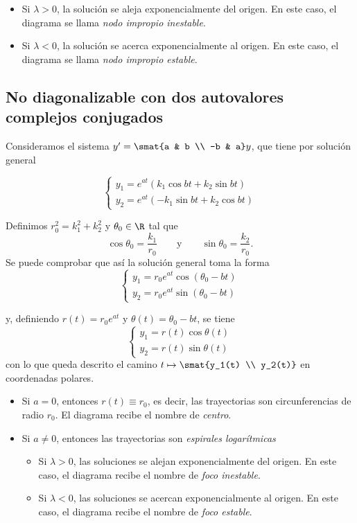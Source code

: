 \documentclass[../ecuaciones_diferenciales.tex]{subfiles}
\begin{document}
\begin{itemize}
	\item Si \(\lambda > 0\), la solución se aleja exponencialmente del origen. En
	      este caso, el diagrama se llama \emph{nodo impropio inestable}.
	\item Si \(\lambda < 0\), la solución se acerca exponencialmente al origen. En
	      este caso, el diagrama se llama \emph{nodo impropio estable}.
\end{itemize}

\subsection{No diagonalizable con dos autovalores complejos conjugados}
Consideramos el sistema \(y' = \smat{a & b \\ -b & a}y\), que tiene por solución
general

\[
	\begin{cases}
		y_1 = e^{at}(k_1 \cos bt + k_2 \sin bt) \\
		y_2 = e^{at}(-k_1 \sin bt + k_2 \cos bt)
	\end{cases}
\]

Definimos \(r_0^2 = k_1^2+k_2^2\) y \(\theta_0 \in \R\) tal que
\[\cos \theta_0 = \frac{k_1}{r_0} \qquad \text{y} \qquad \sin \theta_0 = \frac{k_2}{r_0}.\]
Se puede comprobar que así la solución general toma la forma
\[
	\begin{cases}
		y_1 = r_0e^{at} \cos (\theta_0 - bt) \\
		y_2 = r_0e^{at} \sin (\theta_0 - bt)
	\end{cases}
\]

y, definiendo \(r(t) = r_0e^{at}\) y \(\theta(t) = \theta_0 - bt\), se tiene
\[
	\begin{cases}
		y_1 = r(t) \cos \theta(t) \\
		y_2 = r(t) \sin \theta(t)
	\end{cases}
\]
con lo que queda descrito el camino \(t \mapsto \smat{y_1(t) \\ y_2(t)}\) en
coordenadas polares.

\begin{itemize}
	\item Si \(a = 0\), entonces \(r(t) \equiv r_0\), es decir, las trayectorias son
	      circunferencias de radio \(r_0\). El diagrama recibe el nombre de \emph{centro}.
	\item Si \(a \neq 0\), entonces las trayectorias son \emph{espirales logarítmicas}
	      \begin{itemize}
		      \item Si \(\lambda > 0\), las soluciones se alejan exponencialmente del
		            origen. En este caso, el diagrama recibe el nombre de \emph{foco inestable}.
		      \item Si \(\lambda < 0\), las soluciones se acercan exponencialmente al
		            origen. En este caso, el diagrama recibe el nombre de \emph{foco estable}.
	      \end{itemize}
\end{itemize}
\end{document}
